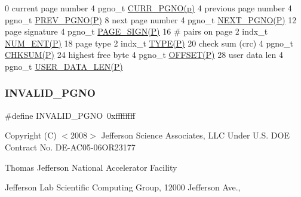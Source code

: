  0 current page number 4 pgno\+\_\+t \mbox{\hyperlink{adat-devel_2other__libs_2filedb_2filehash_2ffdb__page_8h_a457153d6443527e77cf6c014418b3f0c}{C\+U\+R\+R\+\_\+\+P\+G\+N\+O(p)}} 4 previous page number 4 pgno\+\_\+t \mbox{\hyperlink{adat-devel_2other__libs_2filedb_2filehash_2ffdb__page_8h_a9f3ec51602d190743b13ac9322bea011}{P\+R\+E\+V\+\_\+\+P\+G\+N\+O(\+P)}} 8 next page number 4 pgno\+\_\+t \mbox{\hyperlink{adat-devel_2other__libs_2filedb_2filehash_2ffdb__page_8h_af1b39c2678bf46751c0a27214c45ac06}{N\+E\+X\+T\+\_\+\+P\+G\+N\+O(\+P)}} 12 page signature 4 pgno\+\_\+t \mbox{\hyperlink{adat-devel_2other__libs_2filedb_2filehash_2ffdb__page_8h_ae3a4cc6ec4e8e6abdeb46e9bc3746a00}{P\+A\+G\+E\+\_\+\+S\+I\+G\+N(\+P)}} 16 \# pairs on page 2 indx\+\_\+t \mbox{\hyperlink{adat-devel_2other__libs_2filedb_2filehash_2ffdb__page_8h_a2c1f890bf697f759dd5f4d7543d3d581}{N\+U\+M\+\_\+\+E\+N\+T(\+P)}} 18 page type 2 indx\+\_\+t \mbox{\hyperlink{adat-devel_2other__libs_2filedb_2filehash_2ffdb__page_8h_aa26538940485245e2d25f34c9438d924}{T\+Y\+P\+E(\+P)}} 20 check sum (crc) 4 pgno\+\_\+t \mbox{\hyperlink{adat-devel_2other__libs_2filedb_2filehash_2ffdb__page_8h_a2afb823434e3edd5930ccde30f1c5e44}{C\+H\+K\+S\+U\+M(\+P)}} 24 highest free byte 4 pgno\+\_\+t \mbox{\hyperlink{adat-devel_2other__libs_2filedb_2filehash_2ffdb__page_8h_a4dbf6956d979a56c436126902acd9f6d}{O\+F\+F\+S\+E\+T(\+P)}} 28 user data len 4 pgno\+\_\+t \mbox{\hyperlink{adat-devel_2other__libs_2filedb_2filehash_2ffdb__page_8h_a4732458d206f95f8a3090ba02d624709}{U\+S\+E\+R\+\_\+\+D\+A\+T\+A\+\_\+\+L\+E\+N(\+P)}} \mbox{\label{adat-devel_2other__libs_2filedb_2filehash_2ffdb__page_8h_a4dac599d4a7d7303608039932d892590}} 
\subsubsection{\texorpdfstring{INVALID\_PGNO}{INVALID\_PGNO}}
{\footnotesize\ttfamily \#define I\+N\+V\+A\+L\+I\+D\+\_\+\+P\+G\+NO~0xffffffff}

Copyright (C) $<$2008$>$ Jefferson Science Associates, L\+LC Under U.\+S. D\+OE Contract No. D\+E-\/\+A\+C05-\/06\+O\+R23177

Thomas Jefferson National Accelerator Facility

Jefferson Lab Scientific Computing Group, 12000 Jefferson Ave.,

